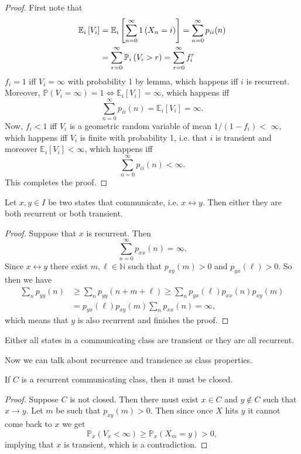 \documentclass[a4paper,11pt]{article}
\begin{document}
\begin{proof}
    First note that
    \begin{align*}
        \mathbb{E}_i\left[V_i\right]&=\mathbb{E}_i\left[\sum_{n=0}^{\infty} 1\left(X_n=i\right)\right]=\sum_{n=0}^{\infty} p_{i i}(n)\\ 
        &=\sum_{r=0}^{\infty} {\mathbb{P}}_i\left(V_i>r\right)=\sum_{r=0}^{\infty} f_i^r
    \end{align*}
    $f_i=1$ iff $V_i=\infty$ with probability 1 by lemma, which happens iff $i$ is recurrent. Moreover, $\mathbb{P}(V_i=\infty)=1 \Leftrightarrow \mathbb{E}_i\left[V_i\right]=\infty$, which happens iff
    \[
    \sum_{n=0}^{\infty} p_{i i}(n)=\mathbb{E}_i\left[V_i\right]=\infty .
    \]
    Now, $f_i<1$ iff $V_i$ is a geometric random variable of mean $1 /\left(1-f_i\right)<$ $\infty$, which happens iff $V_i$ is finite with probability 1, i.e. that $i$ is transient and moreover $\mathbb{E}_i\left[V_i\right]<\infty$, which happens iff
    \[
    \sum_{n=0}^{\infty} p_{i i}(n)<\infty .
    \]
    This completes the proof.
\end{proof}

\begin{theorem}
    Let $x, y \in I$ be two states that communicate, i.e. $x \leftrightarrow y$. Then either they are both recurrent or both transient.
\end{theorem}
\begin{proof}
    Suppose that $x$ is recurrent. Then
    \[
    \sum_{n=0}^{\infty} p_{x x}(n)=\infty .
    \]
    Since $x \leftrightarrow y$ there exist $m, \ell \in \mathbb{N}$ such that $p_{x y}(m)>0$ and $p_{y x}(\ell)>0$. So then we have
    \begin{align*}
        \sum_n p_{y y}(n) &\geq \sum_n p_{y y}(n+m+\ell) \geq \sum_n p_{y x}(\ell) p_{x x}(n) p_{x y}(m)\\ 
        &=p_{y x}(\ell) p_{x y}(m) \sum_n p_{x x}(n)=\infty,
    \end{align*}
    which means that $y$ is also recurrent and finishes the proof.
\end{proof}

\begin{corollary}
    Either all states in a communicating class are transient or they are all recurrent. 
\end{corollary}

Now we can talk about recurrence and transience as class properties. 

\begin{theorem}
    If $C$ is a recurrent communicating class, then it must be closed.
\end{theorem}
\begin{proof}
    Suppose $C$ is not closed. Then there must exist $x \in C$ and $y \notin C$ such that $x \rightarrow y$. Let $m$ be such that $p_{x y}(m)>0$. Then since once $X$ hits $y$ it cannot come back to $x$ we get
    \[
    \mathbb{P}_x\left(V_x<\infty\right) \geq \mathbb{P}_x\left(X_m=y\right)>0,
    \]
    implying that $x$ is transient, which is a contradiction.
\end{proof}
\end{document}
